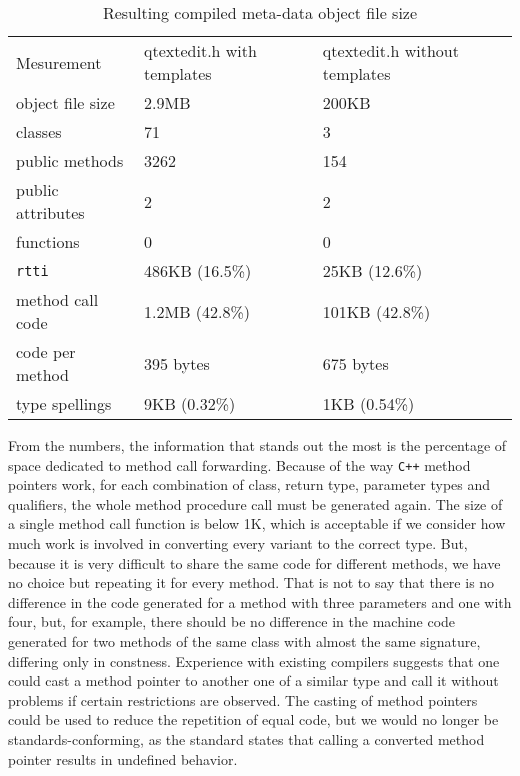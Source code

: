 \begin{table}[ht]

\centering
\caption{Resulting compiled meta-data object file size}
\label{tab:table1}
\begin{tabular}{lll}
\hline\noalign{\smallskip}
Mesurement & qtextedit.h with templates & qtextedit.h without templates\\
\noalign{\smallskip}
\hline
\noalign{\smallskip}
object file size & 2.9MB & 200KB\\
classes & 71 & 3\\
public methods & 3262 & 154\\
public attributes & 2 & 2\\
functions & 0 & 0\\
\texttt{rtti} & 486KB (16.5\%) & 25KB (12.6\%)\\
method call code & 1.2MB (42.8\%) & 101KB (42.8\%)\\
code per method & 395 bytes & 675 bytes\\
type spellings & 9KB (0.32\%) & 1KB (0.54\%)\\
\hline
\end{tabular}
\end{table}
\noindent

From the numbers, the information that stands out the most is the percentage of space dedicated to method call forwarding.
Because of the way \texttt{C++} method pointers work, for each combination of class, return type, parameter types and qualifiers, the
whole method procedure call must be generated again. The size of a single method call function is below 1K, which is acceptable
if we consider how much work is involved in converting every variant to the correct type. But, because it is very difficult
to share the same code for different methods, we have no choice but repeating it for every method. That is not to say that
there is no difference in the code generated for a method with three parameters and one with four, but, for example,
there should be no difference in the machine code generated for two methods of the same class with almost the same signature,
differing only in constness. Experience with existing compilers suggests that one could cast a method pointer to another 
one of a similar type \cite{Clugston} and call it without problems if certain restrictions are observed. The casting of method pointers could
be used to reduce the repetition of equal code, but we would no longer be standards-conforming, as the standard states that calling
a converted method pointer results in undefined behavior.

